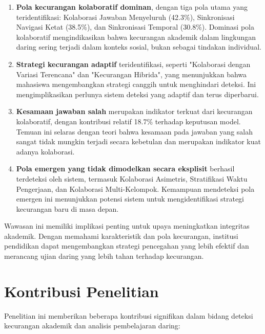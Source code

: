 \begin{enumerate}
    \item \textbf{Pola kecurangan kolaboratif dominan}, dengan tiga pola utama yang teridentifikasi: Kolaborasi Jawaban Menyeluruh (42.3\%), Sinkronisasi Navigasi Ketat (38.5\%), dan Sinkronisasi Temporal (30.8\%). Dominasi pola kolaboratif mengindikasikan bahwa kecurangan akademik dalam lingkungan daring sering terjadi dalam konteks sosial, bukan sebagai tindakan individual.
    
    \item \textbf{Strategi kecurangan adaptif} teridentifikasi, seperti "Kolaborasi dengan Variasi Terencana" dan "Kecurangan Hibrida", yang menunjukkan bahwa mahasiswa mengembangkan strategi canggih untuk menghindari deteksi. Ini mengimplikasikan perlunya sistem deteksi yang adaptif dan terus diperbarui.
    
    \item \textbf{Kesamaan jawaban salah} merupakan indikator terkuat dari kecurangan kolaboratif, dengan kontribusi relatif 18.7\% terhadap keputusan model. Temuan ini selaras dengan teori bahwa kesamaan pada jawaban yang salah sangat tidak mungkin terjadi secara kebetulan dan merupakan indikator kuat adanya kolaborasi.
    
    \item \textbf{Pola emergen yang tidak dimodelkan secara eksplisit} berhasil terdeteksi oleh sistem, termasuk Kolaborasi Asimetris, Stratifikasi Waktu Pengerjaan, dan Kolaborasi Multi-Kelompok. Kemampuan mendeteksi pola emergen ini menunjukkan potensi sistem untuk mengidentifikasi strategi kecurangan baru di masa depan.
\end{enumerate}

Wawasan ini memiliki implikasi penting untuk upaya meningkatkan integritas akademik. Dengan memahami karakteristik dan pola kecurangan, institusi pendidikan dapat mengembangkan strategi pencegahan yang lebih efektif dan merancang ujian daring yang lebih tahan terhadap kecurangan.

\section{Kontribusi Penelitian}
\label{sec:kontribusi}

Penelitian ini memberikan beberapa kontribusi signifikan dalam bidang deteksi kecurangan akademik dan analisis pembelajaran daring:

